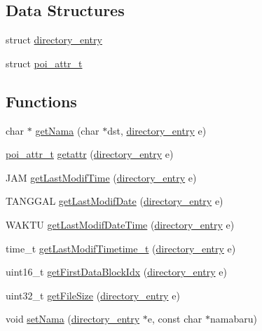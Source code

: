\subsection*{Data Structures}
\begin{DoxyCompactItemize}
\item 
struct \hyperlink{structdirectory__entry}{directory\-\_\-entry}
\item 
struct \hyperlink{structpoi__attr__t}{poi\-\_\-attr\-\_\-t}
\end{DoxyCompactItemize}
\subsection*{Functions}
\begin{DoxyCompactItemize}
\item 
char $\ast$ \hyperlink{directory-entry_8h_a0a7b4158bec0f7e95ad6df41314397cd}{get\-Nama} (char $\ast$dst, \hyperlink{structdirectory__entry}{directory\-\_\-entry} e)
\item 
\hyperlink{structpoi__attr__t}{poi\-\_\-attr\-\_\-t} \hyperlink{directory-entry_8h_a227f567ee0e8d9841e899f0dec64d678}{getattr} (\hyperlink{structdirectory__entry}{directory\-\_\-entry} e)
\item 
J\-A\-M \hyperlink{directory-entry_8h_aefc5e5fefc3001fa03539165440f4720}{get\-Last\-Modif\-Time} (\hyperlink{structdirectory__entry}{directory\-\_\-entry} e)
\item 
T\-A\-N\-G\-G\-A\-L \hyperlink{directory-entry_8h_a40cef09c0fc8f91e59441578582e0b8e}{get\-Last\-Modif\-Date} (\hyperlink{structdirectory__entry}{directory\-\_\-entry} e)
\item 
W\-A\-K\-T\-U \hyperlink{directory-entry_8h_a470a6bf272a569acfa071474105e2317}{get\-Last\-Modif\-Date\-Time} (\hyperlink{structdirectory__entry}{directory\-\_\-entry} e)
\item 
time\-\_\-t \hyperlink{directory-entry_8h_ac5adead83b794823faf9472d68a6ce23}{get\-Last\-Modif\-Timetime\-\_\-t} (\hyperlink{structdirectory__entry}{directory\-\_\-entry} e)
\item 
uint16\-\_\-t \hyperlink{directory-entry_8h_ae2d5c0b699d98670b2d768bc747ee9c3}{get\-First\-Data\-Block\-Idx} (\hyperlink{structdirectory__entry}{directory\-\_\-entry} e)
\item 
uint32\-\_\-t \hyperlink{directory-entry_8h_a21ccf64e7638d962dba75f7c4b62ab69}{get\-File\-Size} (\hyperlink{structdirectory__entry}{directory\-\_\-entry} e)
\item 
void \hyperlink{directory-entry_8h_addf18916a7811fb36426ee54da8ae725}{set\-Nama} (\hyperlink{structdirectory__entry}{directory\-\_\-entry} $\ast$e, const char $\ast$namabaru)

\end{DoxyCompactItemize}
